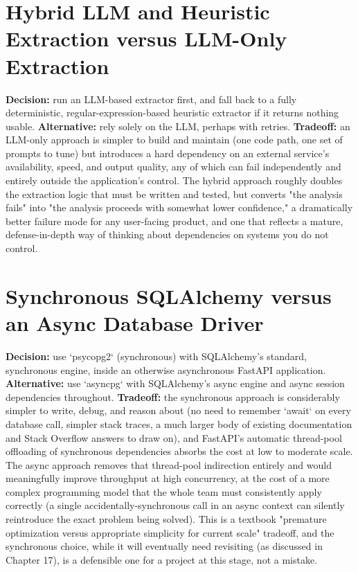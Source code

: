 \documentclass[11pt,a4paper]{report}
\begin{document}
\section{Hybrid LLM and Heuristic Extraction versus LLM-Only Extraction}

\textbf{Decision:} run an LLM-based extractor first, and fall back to a fully deterministic, regular-expression-based heuristic extractor if it returns nothing usable.
\textbf{Alternative:} rely solely on the LLM, perhaps with retries.
\textbf{Tradeoff:} an LLM-only approach is simpler to build and maintain (one code path, one set of prompts to tune) but introduces a hard dependency on an external service's availability, speed, and output quality, any of which can fail independently and entirely outside the application's control. The hybrid approach roughly doubles the extraction logic that must be written and tested, but converts "the analysis fails" into "the analysis proceeds with somewhat lower confidence," a dramatically better failure mode for any user-facing product, and one that reflects a mature, defense-in-depth way of thinking about dependencies on systems you do not control.

\section{Synchronous SQLAlchemy versus an Async Database Driver}

\textbf{Decision:} use `psycopg2` (synchronous) with SQLAlchemy's standard, synchronous engine, inside an otherwise asynchronous FastAPI application.
\textbf{Alternative:} use `asyncpg` with SQLAlchemy's async engine and async session dependencies throughout.
\textbf{Tradeoff:} the synchronous approach is considerably simpler to write, debug, and reason about (no need to remember `await` on every database call, simpler stack traces, a much larger body of existing documentation and Stack Overflow answers to draw on), and FastAPI's automatic thread-pool offloading of synchronous dependencies absorbs the cost at low to moderate scale. The async approach removes that thread-pool indirection entirely and would meaningfully improve throughput at high concurrency, at the cost of a more complex programming model that the whole team must consistently apply correctly (a single accidentally-synchronous call in an async context can silently reintroduce the exact problem being solved). This is a textbook "premature optimization versus appropriate simplicity for current scale" tradeoff, and the synchronous choice, while it will eventually need revisiting (as discussed in Chapter 17), is a defensible one for a project at this stage, not a mistake.
\end{document}
